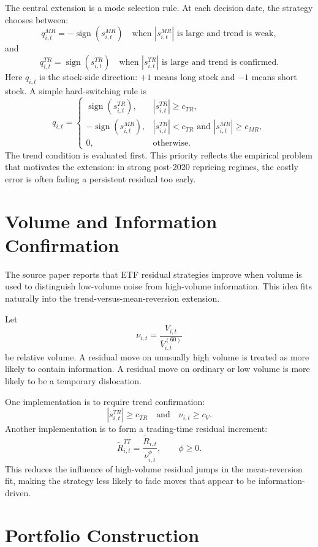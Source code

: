 \documentclass[11pt]{article}
\begin{document}
The central extension is a mode selection rule. At each decision date, the
strategy chooses between:
\[
    q^{MR}_{i,t}
    =
    -\operatorname{sign}(s^{MR}_{i,t})
    \quad\text{when } |s^{MR}_{i,t}| \text{ is large and trend is weak},
\]
and
\[
    q^{TR}_{i,t}
    =
    \operatorname{sign}(s^{TR}_{i,t})
    \quad\text{when } |s^{TR}_{i,t}| \text{ is large and trend is confirmed}.
\]
Here $q_{i,t}$ is the stock-side direction: $+1$ means long stock and $-1$
means short stock. A simple hard-switching rule is
\[
    q_{i,t}
    =
    \begin{cases}
    \operatorname{sign}(s^{TR}_{i,t}),
        & |s^{TR}_{i,t}| \ge c_{TR},\\
    -\operatorname{sign}(s^{MR}_{i,t}),
        & |s^{TR}_{i,t}| < c_{TR}
          \text{ and } |s^{MR}_{i,t}| \ge c_{MR},\\
    0, & \text{otherwise.}
    \end{cases}
\]
The trend condition is evaluated first. This priority reflects the empirical
problem that motivates the extension: in strong post-2020 repricing regimes,
the costly error is often fading a persistent residual too early.

\section{Volume and Information Confirmation}

The source paper reports that ETF residual strategies improve when volume is
used to distinguish low-volume noise from high-volume information. This idea
fits naturally into the trend-versus-mean-reversion extension.

Let
\[
    \nu_{i,t}
    =
    \frac{V_{i,t}}
         {\overline{V}_{i,t}^{(60)}}
\]
be relative volume. A residual move on unusually high volume is treated as
more likely to contain information. A residual move on ordinary or low volume
is more likely to be a temporary dislocation.

One implementation is to require trend confirmation:
\[
    |s^{TR}_{i,t}| \ge c_{TR}
    \quad\text{and}\quad
    \nu_{i,t} \ge c_V.
\]
Another implementation is to form a trading-time residual increment:
\[
    \widetilde{R}^{TT}_{i,t}
    =
    \frac{\widetilde{R}_{i,t}}{\nu_{i,t}^{\phi}},
    \qquad \phi \ge 0.
\]
This reduces the influence of high-volume residual jumps in the
mean-reversion fit, making the strategy less likely to fade moves that appear
to be information-driven.

\section{Portfolio Construction}
\end{document}
